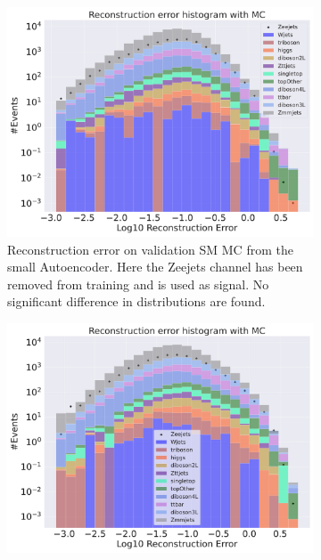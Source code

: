 \begin{figure}[H]
    \centering
    \begin{subfigure}{.45\textwidth}
        \includegraphics[width=\textwidth]{Figures/VAE_testing/small/b_data_recon_big_rm3_feats_sig_Zeejets.pdf}
        \caption{Reconstruction error on validation SM MC from the small Autoencoder. Here the Zeejets channel has been removed from training and 
        is used as signal. No significant difference in distributions are found.}
        \label{fig:vae_small_Zeejets}
    \end{subfigure}
    \hfill 
    \begin{subfigure}{.45\textwidth}
        \includegraphics[width=\textwidth]{Figures/VAE_testing/big/b_data_recon_big_rm3_feats_sig_Zeejets.pdf}

\end{subfigure}
\end{figure}
